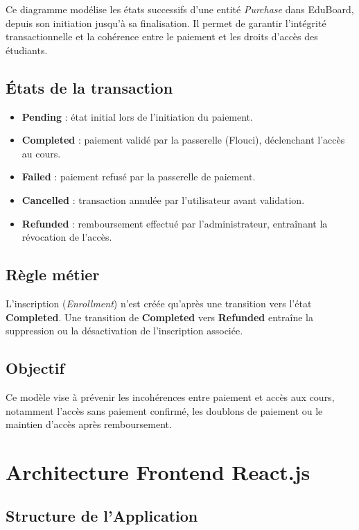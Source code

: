 Ce diagramme modélise les états successifs d’une entité \textit{Purchase} dans EduBoard, depuis son initiation jusqu’à sa finalisation. Il permet de garantir l’intégrité transactionnelle et la cohérence entre le paiement et les droits d’accès des étudiants.

\subsection*{États de la transaction}
\begin{itemize}
    \item \textbf{Pending} : état initial lors de l’initiation du paiement.
    \item \textbf{Completed} : paiement validé par la passerelle (Flouci), déclenchant l’accès au cours.
    \item \textbf{Failed} : paiement refusé par la passerelle de paiement.
    \item \textbf{Cancelled} : transaction annulée par l’utilisateur avant validation.
    \item \textbf{Refunded} : remboursement effectué par l’administrateur, entraînant la révocation de l’accès.
\end{itemize}

\subsection*{Règle métier}
L’inscription (\textit{Enrollment}) n’est créée qu’après une transition vers l’état \textbf{Completed}.  
Une transition de \textbf{Completed} vers \textbf{Refunded} entraîne la suppression ou la désactivation de l’inscription associée.

\subsection*{Objectif}
Ce modèle vise à prévenir les incohérences entre paiement et accès aux cours, notamment l’accès sans paiement confirmé, les doublons de paiement ou le maintien d’accès après remboursement.

\section{Architecture Frontend React.js}

\subsection{Structure de l'Application}

